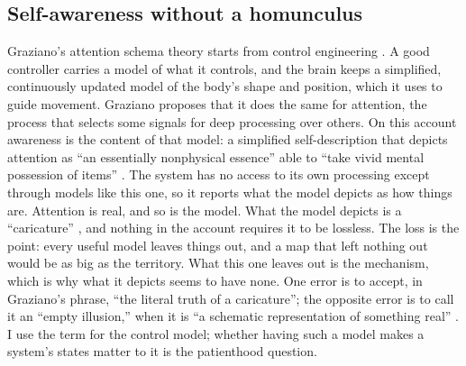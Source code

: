 \subsection{Self-awareness without a homunculus}
\label{sec:21.2.1}
Graziano's attention schema theory starts from control engineering \autocite{graziano2013consciousness,graziano2022framework}. A good controller carries a model of what it controls, and the brain keeps a simplified, continuously updated model of the body's shape and position, which it uses to guide movement. Graziano proposes that it does the same for attention, the process that selects some signals for deep processing over others. On this account awareness is the content of that model: a simplified self-description that depicts attention as “an essentially nonphysical essence” able to “take vivid mental possession of items” \autocite[4]{graziano2022framework}. The system has no access to its own processing except through models like this one, so it reports what the model depicts as how things are. Attention is real, and so is the model. What the model depicts is a “caricature” \autocite[3]{graziano2022framework}, and nothing in the account requires it to be lossless. The loss is the point: every useful model leaves things out, and a map that left nothing out would be as big as the territory. What this one leaves out is the mechanism, which is why what it depicts seems to have none. One error is to accept, in Graziano's phrase, “the literal truth of a caricature”; the opposite error is to call it an “empty illusion,” when it is “a schematic representation of something real” \autocite[7]{graziano2022framework}. I use the term for the control model; whether having such a model makes a system's states matter to it is the patienthood question.

